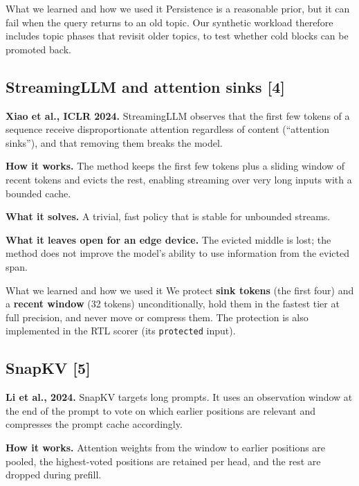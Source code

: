 \documentclass[12pt,a4paper]{report}
\begin{document}
\begin{calloutbox}{What we learned and how we used it}
Persistence is a reasonable prior, but it can fail when the query returns to an old topic. Our synthetic workload therefore includes topic phases that revisit older topics, to test whether cold blocks can be promoted back.

\end{calloutbox}
\subsection{StreamingLLM and attention sinks [4]}
\textbf{Xiao et al., ICLR 2024.} StreamingLLM observes that the first few tokens of a sequence receive disproportionate attention regardless of content (“attention sinks”), and that removing them breaks the model.

\textbf{How it works.} The method keeps the first few tokens plus a sliding window of recent tokens and evicts the rest, enabling streaming over very long inputs with a bounded cache.

\textbf{What it solves.} A trivial, fast policy that is stable for unbounded streams.

\textbf{What it leaves open for an edge device.} The evicted middle is lost; the method does not improve the model's ability to use information from the evicted span.

\begin{calloutbox}{What we learned and how we used it}
We protect \textbf{sink tokens} (the first four) and a \textbf{recent window} (32 tokens) unconditionally, hold them in the fastest tier at full precision, and never move or compress them. The protection is also implemented in the RTL scorer (its \texttt{protected} input).

\end{calloutbox}
\subsection{SnapKV [5]}
\textbf{Li et al., 2024.} SnapKV targets long prompts. It uses an observation window at the end of the prompt to vote on which earlier positions are relevant and compresses the prompt cache accordingly.

\textbf{How it works.} Attention weights from the window to earlier positions are pooled, the highest-voted positions are retained per head, and the rest are dropped during prefill.
\end{document}
